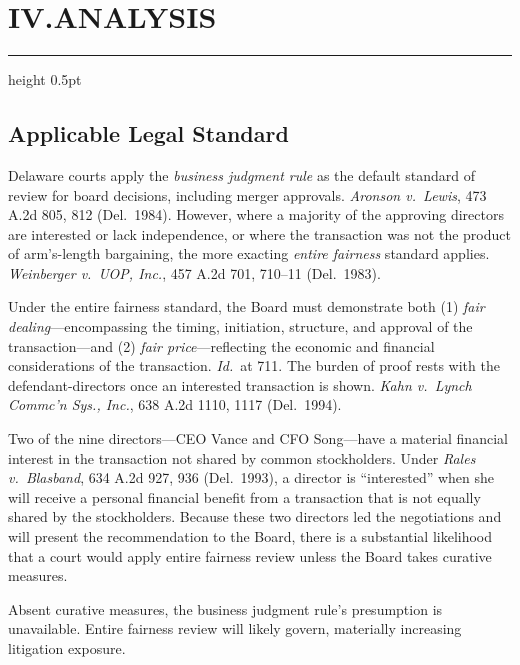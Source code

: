 \section*{IV.\quad ANALYSIS}

{\color{rule}\hrule height 0.5pt}\vspace{6pt}

\subsection{Applicable Legal Standard}

Delaware courts apply the \textit{business judgment rule} as the default standard of review for board decisions, including merger approvals.  \textit{Aronson v.\ Lewis}, 473 A.2d 805, 812 (Del.\ 1984).  However, where a majority of the approving directors are interested or lack independence, or where the transaction was not the product of arm's-length bargaining, the more exacting \textit{entire fairness} standard applies.  \textit{Weinberger v.\ UOP, Inc.}, 457 A.2d 701, 710--11 (Del.\ 1983).

Under the entire fairness standard, the Board must demonstrate both (1) \textit{fair dealing}---encompassing the timing, initiation, structure, and approval of the transaction---and (2) \textit{fair price}---reflecting the economic and financial considerations of the transaction.  \textit{Id.}\ at 711.  The burden of proof rests with the defendant-directors once an interested transaction is shown.  \textit{Kahn v.\ Lynch Commc'n Sys., Inc.}, 638 A.2d 1110, 1117 (Del.\ 1994).

Two of the nine directors---CEO Vance and CFO Song---have a material financial interest in the transaction not shared by common stockholders.  Under \textit{Rales v.\ Blasband}, 634 A.2d 927, 936 (Del.\ 1993), a director is ``interested'' when she will receive a personal financial benefit from a transaction that is not equally shared by the stockholders.  Because these two directors led the negotiations and will present the recommendation to the Board, there is a substantial likelihood that a court would apply entire fairness review unless the Board takes curative measures.

Absent curative measures, the business judgment rule's presumption is unavailable.  Entire fairness review will likely govern, materially increasing litigation exposure.

